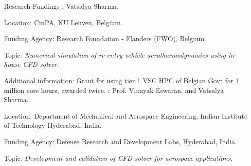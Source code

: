 \begin{rubric}{Research Fundings}
: Vatsalya Sharma.\par
	{Location}: CmPA, KU Leuven, Belgium. \par
    {Funding Agency}: Research Foundation - Flanders (FWO), Belgium. \par
    {Topic}: \emph{Numerical simulation of re-entry vehicle aerothermodynamics using in-house CFD solver.}\par
    {Additional information}: {Grant for using tier 1 VSC HPC of Belgian Govt for 1 million core hours, awarded twice}.
: Prof. Vinayak Eswaran, and Vatsalya Sharma.\par
	{Location}: Department of Mechanical and Aerospace Engineering, Indian Institute of Technology Hyderabad, India. \par
    {Funding Agency}: Defense Research and Development Labs, Hyderabad, India. \par
    {Topic}: \emph{Development and validation of CFD solver for aerospace applications}.%
\end{rubric}